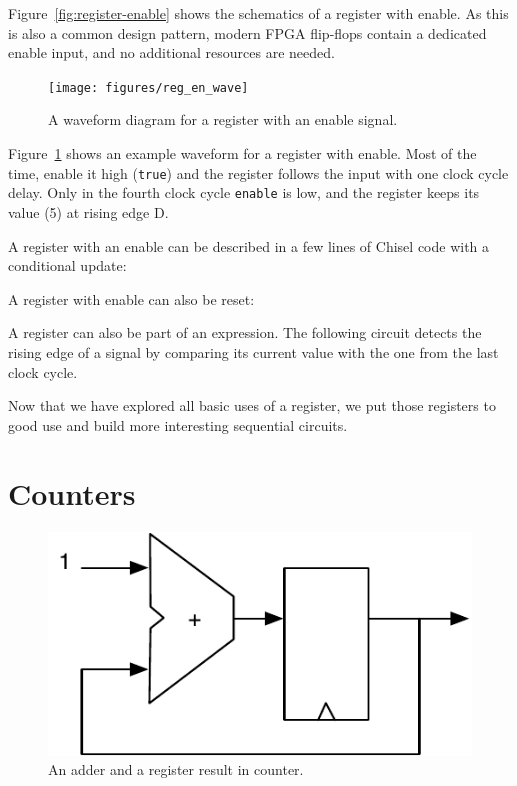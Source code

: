 \documentclass[%
    10pt,
    headinclude, footexclude,
    openright, %
    notitlepage,
    cleardoubleempty,
    headsepline,
    pointlessnumbers,
    bibtotoc, idxtotoc,
    ]{scrbook}
\newcommand{\code}[1]{{\small{\texttt{#1}}}}
\newcommand{\scale}{0.7}
\begin{document}
Figure~\ref{fig:register-enable} shows the schematics of a register with enable.
As this is also a common design pattern, modern FPGA flip-flops contain a
dedicated enable input, and no additional resources are needed.

\begin{figure}
  \centering
  \texttt{[image: figures/reg\_en\_wave]}
  \caption{A waveform diagram for a register with an enable signal.}
  \label{fig:register-en-wave}
\end{figure}

Figure~\ref{fig:register-en-wave} shows an example waveform for a register
with enable. Most of the time, enable it high (\code{true}) and the register
follows the input with one clock cycle delay. Only in the fourth clock cycle
\code{enable} is low, and the register keeps its value (5) at rising edge D.

A register with an enable can be described in a few lines of Chisel code
with a conditional update:


\noindent A register with enable can also be reset:


A register can also be part of an expression. The following circuit detects the rising edge
of a signal by comparing its current value with the one from the last clock cycle.


Now that we have explored all basic uses of a register, we put those registers to
good use and build more interesting sequential circuits.

\section{Counters}
\label{sec:counter}

\begin{figure}
  \centering
  \includegraphics[scale=\scale]{figures/counter}
  \caption{An adder and a register result in counter.}
  \label{fig:counter}
\end{figure}
\end{document}
